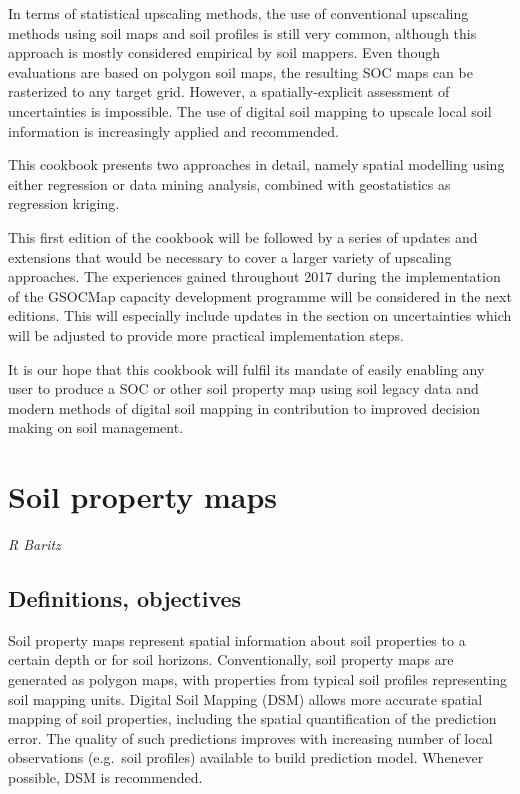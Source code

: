 \documentclass[]{book}
\theoremstyle{definition}
\theoremstyle{definition}
\theoremstyle{definition}
\theoremstyle{remark}
\begin{document}
In terms of statistical upscaling methods, the use of conventional
upscaling methods using soil maps and soil profiles is still very
common, although this approach is mostly considered empirical by soil
mappers. Even though evaluations are based on polygon soil maps, the
resulting SOC maps can be rasterized to any target grid. However, a
spatially-explicit assessment of uncertainties is impossible. The use of
digital soil mapping to upscale local soil information is increasingly
applied and recommended.

This cookbook presents two approaches in detail, namely spatial
modelling using either regression or data mining analysis, combined with
geostatistics as regression kriging.

This first edition of the cookbook will be followed by a series of
updates and extensions that would be necessary to cover a larger variety
of upscaling approaches. The experiences gained throughout 2017 during
the implementation of the GSOCMap capacity development programme will be
considered in the next editions. This will especially include updates in
the section on uncertainties which will be adjusted to provide more
practical implementation steps.

It is our hope that this cookbook will fulfil its mandate of easily
enabling any user to produce a SOC or other soil property map using soil
legacy data and modern methods of digital soil mapping in contribution
to improved decision making on soil management.

\chapter{Soil property maps}\label{soil-property-maps}

\emph{R Baritz}

\section{Definitions, objectives}\label{definitions-objectives}

Soil property maps represent spatial information about soil properties
to a certain depth or for soil horizons. Conventionally, soil property
maps are generated as polygon maps, with properties from typical soil
profiles representing soil mapping units. Digital Soil Mapping (DSM)
allows more accurate spatial mapping of soil properties, including the
spatial quantification of the prediction error. The quality of such
predictions improves with increasing number of local observations
(e.g.~soil profiles) available to build prediction model. Whenever
possible, DSM is recommended.
\end{document}
